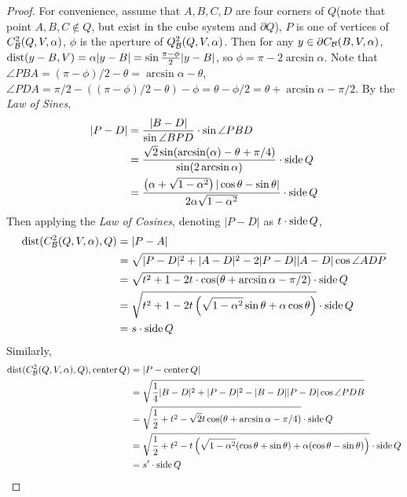 \begin{proof}
    For convenience, assume that $A, B, C, D$ are four corners of $Q$(note that point $A, B, C\notin Q$, but exist in the cube system and $\partial Q$), $P$ is one of vertices of $C_\mathcal B^2(Q, V, \alpha)$, $\phi$ is the aperture of $Q_\mathcal B^2(Q, V, \alpha)$. Then for any $y\in\partial C_\mathcal B(B, V, \alpha)$, $\operatorname{dist}(y-B, V) = \alpha|y-B| = \sin\frac{\pi-\phi}{2} |y-B|$, so $\phi = \pi-2\arcsin \alpha$. Note that $\angle PBA = (\pi-\phi)/2 -\theta = \arcsin \alpha -\theta$, $\angle PDA = \pi/2 - ((\pi-\phi)/2 - \theta) - \phi = \theta -\phi/2 = \theta + \arcsin \alpha -\pi/2$. By the \textit{Law of Sines},
    \begin{equation*}
        \begin{split}
            |P-D| &= \frac{|B-D|}{\sin \angle BPD}\cdot \sin\angle PBD \\
            &= \frac{ \sqrt{2}\sin(\arcsin (\alpha) - \theta + \pi/4)}{\sin (2\arcsin \alpha) } \cdot \operatorname{side} Q\\
            &= \frac{ \left(\alpha + \sqrt{1-\alpha^2} \right)|\cos \theta-\sin\theta|}{2\alpha\sqrt{1-\alpha^2} } \cdot \operatorname{side} Q
        \end{split}
    \end{equation*} 
    Then applying the \textit{Law of Cosines}, denoting $|P-D|$ as $t\cdot \operatorname{side} Q$,
    \begin{equation*}
        \begin{split}
            \operatorname{dist}(C_\mathcal B^2(Q, V, \alpha), Q) &= |P-A|\\
            &= \sqrt{|P-D|^2 + |A-D|^2 - 2|P-D||A-D|\cos \angle ADP} \\
            &= \sqrt{t^2 + 1 - 2t\cdot\cos(\theta + \arcsin \alpha -\pi/2) }\cdot \operatorname{side} Q \\
            &= \sqrt{t^2 + 1 - 2t\left( \sqrt{1-\alpha^2} \sin \theta + \alpha\cos\theta\right) }\cdot \operatorname{side} Q \\
            &= s\cdot \operatorname{side} Q
        \end{split}
    \end{equation*}
    Similarly,
    \begin{equation*}
        \begin{split}
             \operatorname{dist}(C_\mathcal B^2(Q, V, \alpha), Q), \operatorname{center} Q) &= |P- \operatorname{center} Q| \\
            &= \sqrt{\frac{1}{4}|B-D|^2 + |P-D|^2 - |B-D||P-D|\cos\angle PDB} \\ 
            &= \sqrt{\frac{1}{2} + t^2 - \sqrt{2} t \cos(\theta + \arcsin \alpha -\pi/4)}\cdot \operatorname{side} Q \\
            &= \sqrt{\frac{1}{2} + t^2 -  t \left( \sqrt{1-\alpha^2}(\cos\theta +\sin\theta) + \alpha(\cos\theta -\sin\theta)\right)}\cdot \operatorname{side} Q \\
            &= s^\prime \cdot \operatorname{side} Q
        \end{split}
    \end{equation*}
\end{proof}

